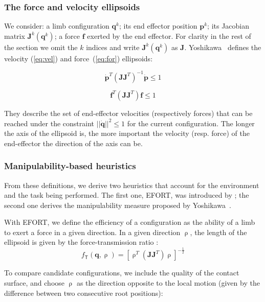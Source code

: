 \documentclass[journal]{IEEEtran}
\begin{document}
\subsubsection{The force and velocity ellipsoids}

We consider: a limb configuration $\mathbf{q}^k$; its end effector position $\mathbf{p}^k$; its Jacobian matrix
$\mathbf{J}^k(\mathbf{q}^k)$; a force $\mathbf{f}$ exerted by the end effector. For clarity in the rest of the section we omit the $k$ indices and write $\mathbf{J}^k(\mathbf{q}^k)$ as $\mathbf{J}$.
Yoshikawa~\cite{Yoshikawa1984} defines the velocity (\ref{eq:vel}) and force~(\ref{eq:for}) ellipsoids:
 
 \begin{equation} 
 \label{eq:vel}
\mathbf{\dot{p}}^T(\mathbf{J}\mathbf{J}^T)^{-1}\mathbf{\dot{p}} \leq 1 
\end{equation}
 
 \begin{equation} 
 \label{eq:for}
\mathbf{f}^T (\mathbf{J}\mathbf{J}^T) \mathbf{f} \leq 1
\end{equation}

They describe the set of end-effector velocities (respectively forces) that can
be reached under the constraint $||\dot{\mathbf{q}}||^2 \leq 1$ for the current configuration.
The longer the axis of the ellipsoid is, the more important the velocity (resp. force) of the end-effector the direction of the axis can be.
 
\subsubsection{Manipulability-based heuristics}
From these definitions, we derive two heuristics that account for the environment and the task being performed.
The first one, EFORT, was introduced by \cite{Tonneau2014}; the second one derives the manipulability measure proposed by Yoshikawa~\cite{Yoshikawa1984}.

With EFORT, we define the efficiency of a configuration as the ability of a limb to exert a force in a given direction.
In a given direction $\uprho$, the length of the ellipsoid is given by the force-transmission ratio \citep{1087795}:
\begin{equation*}
f_\mathsf{T}(\mathbf{q}, \uprho) = [\uprho^{T}(\mathbf{J}\mathbf{J}	^{T})\uprho]^{-\frac{1}{2}}
\end{equation*}

To compare candidate configurations, we include the quality of the contact surface, and choose $\uprho$ as the direction opposite to the local motion (given by the difference between two consecutive root positions):
\end{document}
